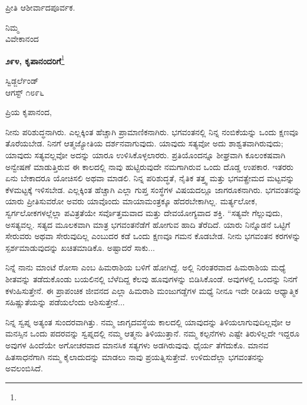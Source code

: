 ಪ್ರೀತಿ ಆಶೀರ್ವಾದಪೂರ್ವಕ.

\vspace{-0.5cm}

{\flushright
ನಿಮ್ಮ\\ವಿವೇಕಾನಂದ\par}

\begin{center}
\textbf{೨೯೪, ಕೃಪಾನಂದರಿಗೆ}\footnote{}
\end{center}

\vspace{-0.5cm}

\begin{flushright}
ಸ್ವಿಡ್ಜರ್ಲೆಂಡ್\\ಆಗಸ್ಟ್ ೧೮೯೬
\end{flushright}

\vspace{-0.3cm}

\noindent
ಪ್ರಿಯ ಕೃಪಾನಂದ,

ನೀನು ಪರಿಶುದ್ಧನಾಗಿರು. ಎಲ್ಲಕ್ಕಿಂತ ಹೆಚ್ಚಾಗಿ ಪ್ರಾಮಾಣಿಕನಾಗಿರು. ಭಗವಂತನಲ್ಲಿ ನಿನ್ನ ನಂಬಿಕೆಯನ್ನು ಒಂದು ಕ್ಷಣವೂ ತೊರೆಯಬೇಡ. ನಿನಗೆ ಆತ್ಮಜ್ಯೋತಿಯ ದರ್ಶನವಾಗುವುದು. ಯಾವುದು ಸತ್ಯವೋ ಅದು ಶಾಶ್ವತವಾಗಿರುವುದು; ಯಾವುದು ಸತ್ಯವಲ್ಲವೋ ಅದನ್ನು ಯಾರೂ ಉಳಿಸಿಕೊಳ್ಳಲಾರರು. ಪ್ರತಿಯೊಂದನ್ನೂ ಶೀಘ್ರವಾಗಿ ಕೂಲಂಕಷವಾಗಿ ಅನ್ವೇಷಣೆ ಮಾಡುತ್ತಿರುವ ಈ ಕಾಲದಲ್ಲಿ ನಾವು ಹುಟ್ಟಿರುವುದೇ ನಮಗಾಗಿರುವ ಒಂದು ದೊಡ್ಡ ಉಪಕಾರ. ಇತರರು ಏನು ಬೇಕಾದರೂ ಯೋಚಿಸಲಿ ಅಥವಾ ಮಾಡಲಿ. ನಿನ್ನ ಪರಿಶುದ್ಧತೆ, ನೈತಿಕ ತತ್ತ್ವ ಮತ್ತು ಭಗವತ್ಪ್ರೇಮದ ಮಟ್ಟವನ್ನು ಕೆಳಮಟ್ಟಕ್ಕೆ ಇಳಿಸಬೇಡ. ಎಲ್ಲಕ್ಕಿಂತ ಹೆಚ್ಚಾಗಿ ಎಲ್ಲಾ ಗುಪ್ತ ಸಂಸ್ಥೆಗಳ ವಿಷಯದಲ್ಲೂ ಜಾಗರೂಕನಾಗಿರು. ಭಗವಂತನನ್ನು ಯಾರು ಪ್ರೀತಿಸುವರೋ ಅವರು ಯಾವೊಂದು ಮಾಯಾಮಂತ್ರಕ್ಕೂ ಹೆದರಬೇಕಾಗಿಲ್ಲ. ಮರ್ತ್ಯಲೋಕ, ಸ್ವರ್ಗಲೋಕಗಳಲ್ಲೆಲ್ಲಾ ಪವಿತ್ರತೆಯೇ ಸರ್ವೊತ್ತಮವಾದ ಮತ್ತು ದೇವಯೋಗ್ಯವಾದ ಶಕ್ತಿ. “ಸತ್ಯವೇ ಗೆಲ್ಲುವುದು, ಅಸತ್ಯವಲ್ಲ. ಸತ್ಯದ ಮೂಲಕವಾಗಿ ಮಾತ್ರ ಭಗವಂತನೆಡೆಗೆ ಹೋಗುವ ಹಾದಿ ತೆರೆದಿದೆ. ಯಾರು ನಿನ್ನೊಡನೆ ಒಟ್ಟಿಗೆ ಸೇರುವರು ಅಥವಾ ಸೇರುವುದಿಲ್ಲ ಎಂಬುದರ ಕಡೆ ಒಂದು ಕ್ಷಣವೂ ಗಮನ ಕೊಡಬೇಡ. ನೀನು ಭಗವಂತನ ಕರಗಳನ್ನು ಸ್ಪರ್ಶಮಾಡುವುದನ್ನು ಖಚಿತಮಾಡಿಕೊ. ಅಷ್ಟಾದರೆ ಸಾಕು...

ನಿನ್ನೆ ನಾನು ಮಾಂಟೆ ರೋಸಾ ಎಂಬ ಹಿಮರಾಶಿಯ ಬಳಿಗೆ ಹೋಗಿದ್ದೆ. ಅಲ್ಲಿ ನಿರಂತರವಾದ ಹಿಮರಾಶಿಯ ಮಧ್ಯೆ ಶೀತವನ್ನು ತಡೆದುಕೊಂಡು ಬಯಲಿನಲ್ಲಿ ಬೆಳೆದಿದ್ದ ಕೆಲವು ಹೂವುಗಳನ್ನು ಬಿಡಿಸಿಕೊಂಡೆ. ಅವುಗಳಲ್ಲಿ ಒಂದನ್ನು ನಿನಗೆ ಕಳುಹಿಸುತ್ತೇನೆ. ಈ ಪ್ರಾಪಂಚಿಕ ಜೀವನದ ಎಲ್ಲಾ ಹಿಮರಾಶಿ ಮಂಜುಗಡ್ಡೆಗಳ ಮಧ್ಯೆ ನೀನೂ ಇದೇ ರೀತಿಯ ಆಧ್ಯಾತ್ಮಿಕ ಸಹಿಷ್ಣುತೆಯನ್ನು ಪಡೆಯಲೆಂದು ಆಶಿಸುತ್ತೇನೆ...

ನಿನ್ನ ಸ್ವಪ್ನ ಅತ್ಯಂತ ಸುಂದರವಾಗಿತ್ತು. ನಮ್ಮ ಜಾಗೃದವಸ್ಥೆಯ ಕಾಲದಲ್ಲಿ ಯಾವುದನ್ನು ತಿಳಿಯಲಾಗುವುದಿಲ್ಲವೋ ಆ ಮನಸ್ಸಿನ ಒಂದು ಪದರವನ್ನು ಸ್ವಪ್ನದಲ್ಲಿ ನಮ್ಮ ಆತ್ಮನು ತಿಳಿಯುತ್ತಾನೆ. ನಮ್ಮ ಕಲ್ಪನೆಗಳು ಎಷ್ಟೇ ತಿರುಳಿಲ್ಲದೇ ಇದ್ದರೂ ಅವುಗಳ ಹಿಂದೆಯೇ ಅಗೋಚರವಾದ ಮಾನಸಿಕ ಸತ್ಯಗಳು ಅಡಗಿರುವುವು. ಧೈರ್ಯ ತೆಗೆದುಕೊ. ಮಾನವ ಹಿತಸಾಧನೆಗಾಗಿ ನಮ್ಮ ಕೈಲಾದುದನ್ನು ಮಾಡಲು ನಾವು ಪ್ರಯತ್ನಿಸುತ್ತೇವೆ. ಉಳಿದುದೆಲ್ಲಾ ಭಗವಂತನನ್ನು ಅವಲಂಬಿಸಿದೆ.

